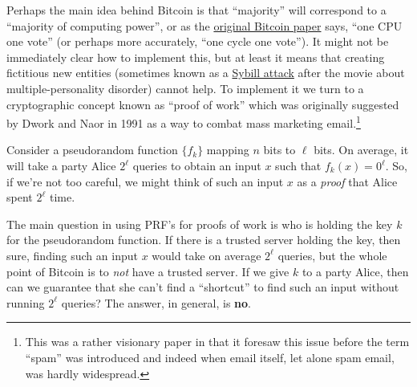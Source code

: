 Perhaps the main idea behind Bitcoin is that ``majority'' will
correspond to a ``majority of computing power'', or as the
\href{https://Bitcoin.org/Bitcoin.pdf}{original Bitcoin paper} says,
``one CPU one vote'' (or perhaps more accurately, ``one cycle one
vote''). It might not be immediately clear how to implement this, but at
least it means that creating fictitious new entities (sometimes known as
a \href{https://goo.gl/jMZ7Qg}{Sybill attack} after the movie about
multiple-personality disorder) cannot help. To implement it we turn to a
cryptographic concept known as ``proof of work'' which was originally
suggested by Dwork and Naor in 1991 as a way to combat mass marketing
email.\footnote{This was a rather visionary paper in that it foresaw
  this issue before the term ``spam'' was introduced and indeed when
  email itself, let alone spam email, was hardly widespread.}

Consider a pseudorandom function \(\{ f_k \}\) mapping \(n\) bits to
\(\ell\) bits. On average, it will take a party Alice \(2^\ell\) queries
to obtain an input \(x\) such that \(f_k(x)=0^\ell\). So, if we're not
too careful, we might think of such an input \(x\) as a \emph{proof}
that Alice spent \(2^\ell\) time.


The main question in using PRF's for proofs of work is who is holding
the key \(k\) for the pseudorandom function. If there is a trusted
server holding the key, then sure, finding such an input \(x\) would
take on average \(2^\ell\) queries, but the whole point of Bitcoin is to
\emph{not} have a trusted server. If we give \(k\) to a party Alice,
then can we guarantee that she can't find a ``shortcut'' to find such an
input without running \(2^\ell\) queries? The answer, in general, is
\textbf{no}.


